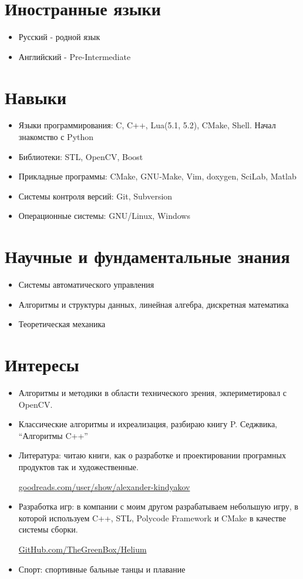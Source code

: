 \documentclass[a4paper, 11pt]{article}
\begin{document}
\section{Иностранные языки}
\begin{itemize}
    \item Русский    - родной язык
    \item Английский - Pre-Intermediate
\end{itemize}

\section{Навыки}
\begin{itemize}
    \item Языки программирования:   C, C++, Lua(5.1, 5.2), CMake, Shell. Начал знакомство с Python
    \item Библиотеки:               STL, OpenCV, Boost
    \item Прикладные программы:     CMake, GNU-Make, Vim, doxygen, SciLab, Matlab
    \item Системы контроля версий:  Git, Subversion
    \item Операционные системы:     GNU/Linux, Windows
\end{itemize}

\section{Научные и фундаментальные знания}
\begin{itemize}
    \item Системы автоматического управления
    \item Алгоритмы и структуры данных, линейная алгебра, дискретная математика
    \item Теоретическая механика
\end{itemize}

\section{Интересы}
\begin{itemize}
    \item Алгоритмы и методики в области технического зрения, экпериметировал с OpenCV.
    \item Классические алгоритмы и ихреализация, разбираю книгу P. Седжвика, ``Алгоритмы C++''
    \item Литература: читаю книги, как о разработке и проектировании програмных
продуктов так и художественные. 

\href{http://www.goodreads.com/user/show/24404721-alexander-kindyakov}{goodreads.com/user/show/alexander-kindyakov}    
    \item Разработка игр: в компании с моим другом разрабатываем небольшую игру, в которой
используем C++, STL, Polycode Framework и CMake в качестве системы сборки.
 
\href{https://github.com/thegreenbox/helium}{GitHub.com/TheGreenBox/Helium}
    \item Спорт: спортивные бальные танцы и плавание
\end{itemize}
\end{document}
